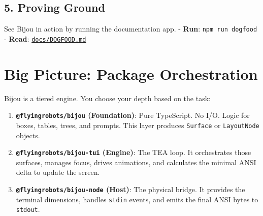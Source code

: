 \subsection{5. Proving Ground}\label{record-008-proving-ground}

See Bijou in action by running the documentation app. - \textbf{Run}: \texttt{n\allowbreak{}p\allowbreak{}m\allowbreak{} \allowbreak{}r\allowbreak{}u\allowbreak{}n\allowbreak{} \allowbreak{}d\allowbreak{}o\allowbreak{}g\allowbreak{}f\allowbreak{}o\allowbreak{}o\allowbreak{}d} - \textbf{Read}: \href{https://github.com/flyingrobots/bijou/blob/cbd70612140e7a450d764b3c7be1c6af878b99bc/docs/DOGFOOD.md}{\texttt{d\allowbreak{}o\allowbreak{}c\allowbreak{}s\allowbreak{}/\allowbreak{}D\allowbreak{}O\allowbreak{}G\allowbreak{}F\allowbreak{}O\allowbreak{}O\allowbreak{}D\allowbreak{}.\allowbreak{}m\allowbreak{}d}}

\section{Big Picture: Package Orchestration}\label{record-008-big-picture-package-orchestration}

Bijou is a tiered engine. You choose your depth based on the task:

\begin{enumerate}
\def\labelenumi{\arabic{enumi}.}
\tightlist
\item
  \textbf{\texttt{@\allowbreak{}f\allowbreak{}l\allowbreak{}y\allowbreak{}i\allowbreak{}n\allowbreak{}g\allowbreak{}r\allowbreak{}o\allowbreak{}b\allowbreak{}o\allowbreak{}t\allowbreak{}s\allowbreak{}/\allowbreak{}b\allowbreak{}i\allowbreak{}j\allowbreak{}o\allowbreak{}u} (Foundation)}: Pure TypeScript. No I/O. Logic for boxes, tables, trees, and prompts. This layer produces \texttt{S\allowbreak{}u\allowbreak{}r\allowbreak{}f\allowbreak{}a\allowbreak{}c\allowbreak{}e} or \texttt{L\allowbreak{}a\allowbreak{}y\allowbreak{}o\allowbreak{}u\allowbreak{}t\allowbreak{}N\allowbreak{}o\allowbreak{}d\allowbreak{}e} objects.
\item
  \textbf{\texttt{@\allowbreak{}f\allowbreak{}l\allowbreak{}y\allowbreak{}i\allowbreak{}n\allowbreak{}g\allowbreak{}r\allowbreak{}o\allowbreak{}b\allowbreak{}o\allowbreak{}t\allowbreak{}s\allowbreak{}/\allowbreak{}b\allowbreak{}i\allowbreak{}j\allowbreak{}o\allowbreak{}u\allowbreak{}-\allowbreak{}t\allowbreak{}u\allowbreak{}i} (Engine)}: The TEA loop. It orchestrates those surfaces, manages focus, drives animations, and calculates the minimal ANSI delta to update the screen.
\item
  \textbf{\texttt{@\allowbreak{}f\allowbreak{}l\allowbreak{}y\allowbreak{}i\allowbreak{}n\allowbreak{}g\allowbreak{}r\allowbreak{}o\allowbreak{}b\allowbreak{}o\allowbreak{}t\allowbreak{}s\allowbreak{}/\allowbreak{}b\allowbreak{}i\allowbreak{}j\allowbreak{}o\allowbreak{}u\allowbreak{}-\allowbreak{}n\allowbreak{}o\allowbreak{}d\allowbreak{}e} (Host)}: The physical bridge. It provides the terminal dimensions, handles \texttt{s\allowbreak{}t\allowbreak{}d\allowbreak{}i\allowbreak{}n} events, and emits the final ANSI bytes to \texttt{s\allowbreak{}t\allowbreak{}d\allowbreak{}o\allowbreak{}u\allowbreak{}t}.
\end{enumerate}

